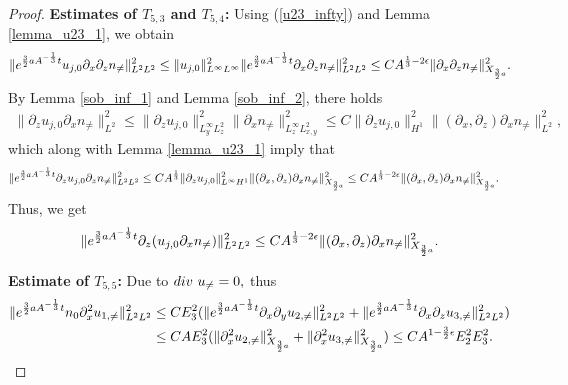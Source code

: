 \documentclass[12pt, reqno]{amsart}
\numberwithin{equation}{section}
\begin{document}
\begin{proof}
		\noindent\textbf{Estimates of $T_{5,3}$ and $T_{5,4}$:}
		Using (\ref{u23_infty}) and Lemma \ref{lemma_u23_1}, we obtain 
		\begin{equation*}
			\begin{aligned}
				\|{\rm e}^{\frac32aA^{-\frac{1}{3}}t}u_{j,0}\partial_x\partial_zn_{\neq}\|^2_{L^2L^2}
				\leq \|u_{j,0}\|^2_{L^{\infty}L^{\infty}}\|{\rm e}^{\frac32aA^{-\frac{1}{3}}t}\partial_x\partial_zn_{\neq}\|^2_{L^2L^2}
				\leq CA^{\frac13-2\epsilon}
				\|\partial_x\partial_zn_{\neq}\|^2_{X_{\frac32a}}.
			\end{aligned}
		\end{equation*}
		By Lemma \ref{sob_inf_1} and Lemma \ref{sob_inf_2}, there holds
		\begin{equation*}
			\begin{aligned}						\|\partial_zu_{j,0}\partial_xn_{\neq}\|^2_{L^2}\leq 
				\|\partial_zu_{j,0}\|^2_{L^{\infty}_yL^2_z}
				\|\partial_xn_{\neq}\|^2_{L^{\infty}_{z}L^2_{x,y}}
				\leq C\|\partial_zu_{j,0}\|^2_{H^1}
				\|(\partial_x,\partial_z)\partial_xn_{\neq}\|_{L^2}^2,
			\end{aligned}
		\end{equation*}
		which along with Lemma \ref{lemma_u23_1} imply that 
		\begin{equation*}
			\begin{aligned}
				&\|{\rm e}^{\frac32aA^{-\frac{1}{3}}t}\partial_zu_{j,0}
				\partial_zn_{\neq}\|^2_{L^2L^2}
				\leq CA^{\frac13}\|\partial_zu_{j,0}\|^2_{L^{\infty}H^1}
				\|(\partial_x,\partial_z)\partial_xn_{\neq}\|^2_{X_{\frac32a}}\leq CA^{\frac13-2\epsilon}
				\|(\partial_x,\partial_z)\partial_xn_{\neq}\|^2_{X_{\frac32a}}.
			\end{aligned}
		\end{equation*}
		Thus, we get  
		\begin{equation*}
			\begin{aligned}
				\|{\rm e}^{\frac32aA^{-\frac{1}{3}}t}\partial_z(u_{j,0}
				\partial_xn_{\neq})\|_{L^2L^2}^2\leq 
				CA^{\frac13-2\epsilon}
				\|(\partial_x,\partial_z)\partial_xn_{\neq}\|^2_{X_{\frac32a}}.
			\end{aligned}
		\end{equation*}
		
		
		\noindent\textbf{Estimate of $T_{5,5}$:}
		Due to ${\rm div}~u_{\neq}=0,$ thus
		\begin{equation*}
			\begin{aligned}
				\|{\rm e}^{\frac32aA^{-\frac{1}{3}}t}
				n_{0}\partial_x^2u_{1,\neq}\|_{L^2L^2}^2
				&\leq CE_3^2(  \|{\rm e}^{\frac32aA^{-\frac{1}{3}}t}
				\partial_x\partial_yu_{2,\neq}\|_{L^2L^2}^2+  		
				\|{\rm e}^{\frac32aA^{-\frac{1}{3}}t}
				\partial_x\partial_zu_{3,\neq}\|_{L^2L^2}^2)
				\\ &\leq CAE_3^2(\|\partial_x^2 u_{2,\neq}\|_{X_{\frac32a}}^2
				+\|\partial_x^2 u_{3,\neq}\|_{X_{\frac32a}}^2)
				\leq CA^{1-\frac32\epsilon}E_2^2E_3^2.
			\end{aligned}
		\end{equation*}
		

\end{proof}
\end{document}

